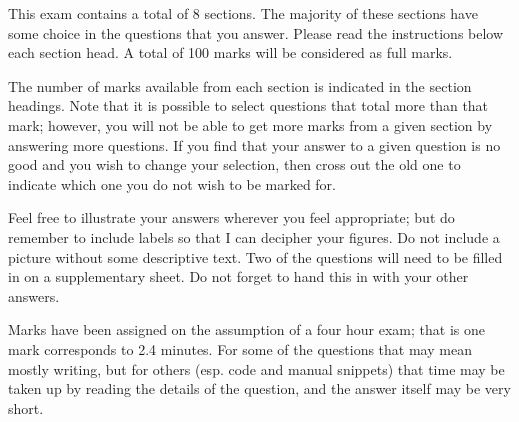 \documentclass[11pt]{article}
\begin{document}
This exam contains a total of 8 sections. The majority of these sections have
some choice in the questions that you answer. Please read the instructions
below each section head. A total of 100 marks will be considered as full marks.

The number of marks available from each section is indicated in the section
headings. Note that it is possible to select questions that total more than
that mark; however, you will not be able to get more marks from a given
section by answering more questions. If you find that your answer to a given
question is no good and you wish to change your selection, then cross out the
old one to indicate which one you do not wish to be marked for.

Feel free to illustrate your answers wherever you feel appropriate; but do
remember to include labels so that I can decipher your figures. Do not include
a picture without some descriptive text. Two of the questions will need to be
filled in on a supplementary sheet. Do not forget to hand this in with your
other answers.

Marks have been assigned on the assumption of a four hour exam; that is one mark
corresponds to 2.4 minutes. For some of the questions that may mean mostly
writing, but for others (esp. code and manual snippets) that time may be taken up by
reading the details of the question, and the answer itself may be very
short.
\end{document}
